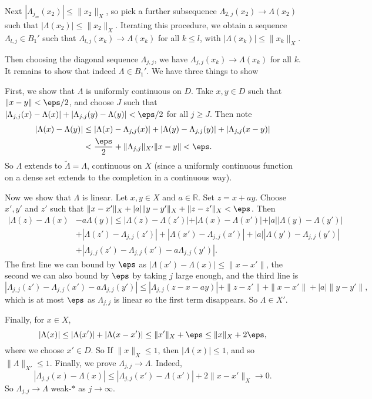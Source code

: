 \documentclass[12pt]{article}
\begin{document}
\begin{proofbox}
	Next $|\Lambda_{j_m}(x_2)| \leq \|x_2\|_X$, so pick a further subsequence $\Lambda_{2, j}(x_2) \to \Lambda(x_2)$ such that $|\Lambda(x_2)| \leq \|x_2\|_X$. Iterating this procedure, we obtain a sequence $\Lambda_{l, j} \in B_1'$ such that $\Lambda_{l, j}(x_k) \to \Lambda(x_k)$ for all $k \leq l$, with $|\Lambda(x_k)| \leq \|x_k\|_X$.

	Then choosing the diagonal sequence $\Lambda_{j, j}$, we have $\Lambda_{j, j}(x_k) \to \Lambda(x_k)$ for all $k$. It remains to show that indeed $\Lambda \in B_1'$. We have three things to show

	First, we show that $\Lambda$ is uniformly continuous on $D$. Take $x, y \in D$ such that $\|x - y\| < \eps/2$, and choose $J$ such that $|\Lambda_{j, j}(x) - \Lambda(x)| + |\Lambda_{j, j}(y) - \Lambda(y)| < \eps/2$ for all $j \geq J$. Then note
	\begin{align*}
		|\Lambda(x) - \Lambda(y)| &\leq |\Lambda(x) - \Lambda_{j, j}(x)| + |\Lambda(y) - \Lambda_{j, j}(y)| + |\Lambda_{j, j}(x - y)| \\
					  & < \frac{\eps}{2} + \|\Lambda_{j, j}\|_{X'} \|x - y\| < \eps.
	\end{align*}
	So $\Lambda$ extends to $\tilde \Lambda = \Lambda$, continuous on $X$ (since a uniformly continuous function on a dense set extends to the completion in a continuous way).

	Now we show that $\Lambda$ is linear. Let $x, y \in X$ and $a \in \mathbb{R}$. Set $z = x + ay$. Choose $x', y'$ and $z'$ such that $\|x - x'\|_X + |a|\|y - y'\|_X + \|z - z'\|_X < \eps$. Then
	\begin{align*}
		|\Lambda(z) - \Lambda(x) &- a \Lambda(y)| \leq |\Lambda(z) - \Lambda(z')| + |\Lambda(x) - \Lambda(x')| + |a| |\Lambda(y) - \Lambda(y')| \\
							 &+ |\Lambda(z') - \Lambda_{j, j}(z')| + |\Lambda(x') - \Lambda_{j, j}(x')| + |a| |\Lambda(y') - \Lambda_{j, j}(y')| \\
							 &+ |\Lambda_{j, j}(z') - \Lambda_{j, j}(x') - a \Lambda_{j, j}(y')|.
	\end{align*}
	The first line we can bound by $\eps$ as $|\Lambda(x') - \Lambda(x)| \leq \|x - x'\|$, the second we can also bound by $\eps$ by taking $j$ large enough, and the third line is
	\[
	|\Lambda_{j, j}(z') - \Lambda_{j, j}(x') - a \Lambda_{j, j}(y')| \leq |\Lambda_{j, j}(z - x - ay)| + \|z - z'\| + \|x - x'\| + |a|\|y - y'\|,
	\]
	which is at most $\eps$ as $\Lambda_{j, j}$ is linear so the first term disappears. So $\Lambda \in X'$.

	Finally, for $x \in X$,
	\[
	|\Lambda(x)| \leq |\Lambda(x')| + |\Lambda(x - x')| \leq \|x'\|_X + \eps \leq \|x\|_X + 2 \eps,
	\]
	where we choose $x' \in D$. So If $\|x\|_X \leq 1$, then $|\Lambda(x)| \leq 1$, and so  $\|\Lambda\|_{X'} \leq 1$. Finally, we prove $\Lambda_{j, j} \to \Lambda$. Indeed,
	\[
	|\Lambda_{j, j}(x) - \Lambda(x)| \leq |\Lambda_{j, j}(x') - \Lambda(x')| + 2 \|x - x'\|_X \to 0.
	\]
	So $\Lambda_{j, j} \to \Lambda$ weak-$\ast$ as $j \to \infty$.
\end{proofbox}
\end{document}
